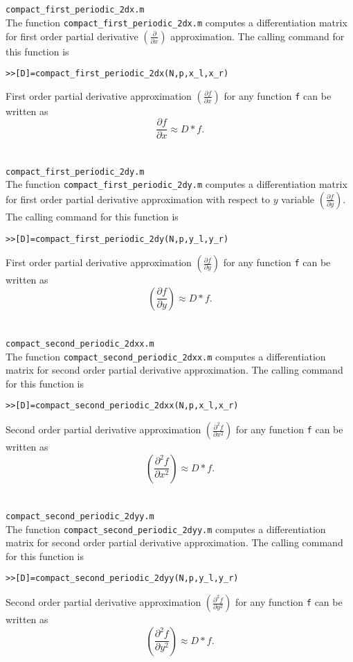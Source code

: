 \documentclass[acmtoms]{acmtrans2m}
\begin{document}
\section{} \verb#compact_first_periodic_2dx.m#\\
 The function \verb#compact_first_periodic_2dx.m# computes a differentiation matrix for first order partial derivative $(\frac{\partial}{\partial x})$ approximation. The calling command for this function is
\begin{alltt}
>>[D]=compact_first_periodic_2dx(N,p,x_l,x_r)
\end{alltt}
First order partial derivative approximation $\left(\frac{\partial f}{\partial x}\right)$ for any function \verb#f# can be written as
\[
\frac{\partial f}{\partial x}\approx D*f.
\]
\section{} \verb#compact_first_periodic_2dy.m#\\
 The function \verb#compact_first_periodic_2dy.m# computes a differentiation matrix for first order partial derivative approximation with respect to $y$ variable $\left(\frac{\partial f}{\partial y}\right)$. The calling command for this function is
\begin{alltt}
>>[D]=compact_first_periodic_2dy(N,p,y_l,y_r)
\end{alltt}
 First order partial derivative approximation $\left(\frac{\partial f}{\partial y}\right)$ for any function \verb#f# can be written as
\[
\left(\frac{\partial f}{\partial y}\right)\approx D*f.
\]
\section{} \verb#compact_second_periodic_2dxx.m#\\
 The function \verb#compact_second_periodic_2dxx.m# computes a differentiation matrix for second order partial derivative approximation. The calling command for this function is
\begin{alltt}
>>[D]=compact_second_periodic_2dxx(N,p,x_l,x_r)
\end{alltt}
Second order partial derivative approximation $\left(\frac{\partial^2 f}{\partial x^2}\right)$ for any function \verb#f# can be written as
\[
\left(\frac{\partial^2 f}{\partial x^2}\right)\approx D*f.
\]
\section{} \verb#compact_second_periodic_2dyy.m#\\
 The function \verb#compact_second_periodic_2dyy.m# computes a differentiation matrix for second order partial derivative approximation. The calling command for this function is
\begin{alltt}
>>[D]=compact_second_periodic_2dyy(N,p,y_l,y_r)
\end{alltt}
 Second order partial derivative approximation $\left(\frac{\partial^2 f}{\partial y^2}\right)$ for any function \verb#f# can be written as
\[
\left(\frac{\partial^2 f}{\partial y^2}\right)\approx D*f.
\]
\end{document}
